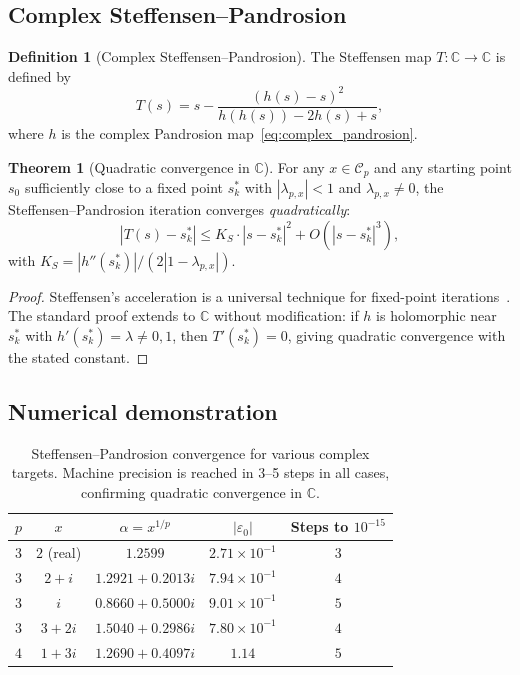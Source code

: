 \documentclass[11pt,a4paper]{article}
\theoremstyle{definition}
\newtheorem{definition}{Definition}[section]
\newtheorem{theorem}{Theorem}[section]
\newcommand{\eps}{\varepsilon}
\newcommand{\CC}{\mathbb{C}}
\begin{document}
\subsection{Complex Steffensen--Pandrosion}

\begin{definition}[Complex Steffensen--Pandrosion]
The Steffensen map $T : \CC \to \CC$ is defined by
\begin{equation}
  \label{eq:steffensen_complex}
  T(s) = s - \frac{(h(s) - s)^2}{h(h(s)) - 2h(s) + s},
\end{equation}
where $h$ is the complex Pandrosion map~\eqref{eq:complex_pandrosion}.
\end{definition}

\begin{theorem}[Quadratic convergence in $\CC$]
\label{thm:steffensen_complex}
For any $x \in \mathcal{C}_p$ and any starting point $s_0$ sufficiently close to a fixed point $s_k^*$ with $|\lambda_{p,x}| < 1$ and $\lambda_{p,x} \neq 0$, the Steffensen--Pandrosion iteration converges \emph{quadratically}:
\[
  |T(s) - s_k^*| \leq K_S \cdot |s - s_k^*|^2 + O(|s - s_k^*|^3),
\]
with $K_S = |h''(s_k^*)| / (2|1 - \lambda_{p,x}|)$.
\end{theorem}

\begin{proof}
Steffensen's acceleration is a universal technique for fixed-point iterations~\cite{stoer}.  The standard proof extends to $\CC$ without modification: if $h$ is holomorphic near $s_k^*$ with $h'(s_k^*) = \lambda \neq 0, 1$, then $T'(s_k^*) = 0$, giving quadratic convergence with the stated constant.
\end{proof}

\subsection{Numerical demonstration}

\begin{table}[h]
\centering
\begin{tabular}{ccccc}
\toprule
$p$ & $x$ & $\alpha = x^{1/p}$ & $|\eps_0|$ & Steps to $10^{-15}$ \\
\midrule
$3$ & $2$ (real) & $1.2599$ & $2.71 \times 10^{-1}$ & $3$ \\
$3$ & $2+i$ & $1.2921 + 0.2013i$ & $7.94 \times 10^{-1}$ & $4$ \\
$3$ & $i$ & $0.8660 + 0.5000i$ & $9.01 \times 10^{-1}$ & $5$ \\
$3$ & $3+2i$ & $1.5040 + 0.2986i$ & $7.80 \times 10^{-1}$ & $4$ \\
$4$ & $1+3i$ & $1.2690 + 0.4097i$ & $1.14$ & $5$ \\
\bottomrule
\end{tabular}
\caption{Steffensen--Pandrosion convergence for various complex targets.  Machine precision is reached in 3--5 steps in all cases, confirming quadratic convergence in $\CC$.}
\label{tab:steffensen_complex}
\end{table}
\end{document}
